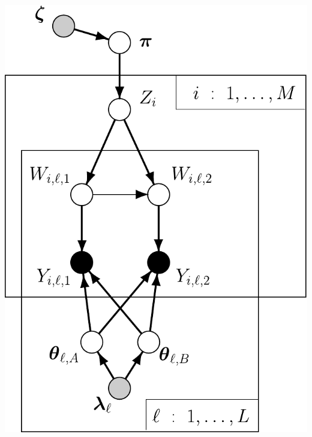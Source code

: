 \begin{minipage}{.42\textwidth}
\vfill
\hfill\includegraphics*[width=.95\textwidth]{illus/NewHybDG.pdf}
\vfill
\end{minipage}



%


